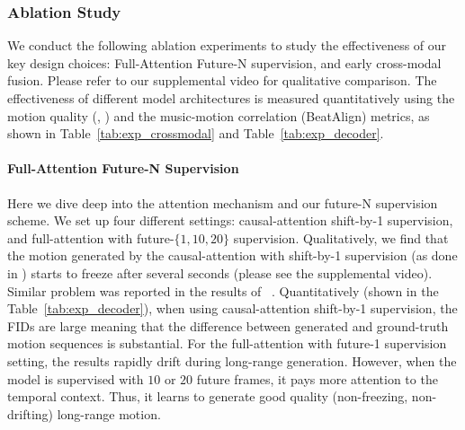 \subsubsection{Ablation Study}
\label{sec:ablation_study}
We conduct the following ablation experiments to study the effectiveness of our key design choices: Full-Attention Future-N supervision, and early cross-modal fusion. Please refer to our supplemental video for qualitative comparison.
The effectiveness of different model architectures is measured quantitatively using the motion quality (\FIDk, \FIDm) and the music-motion correlation (BeatAlign) metrics, as shown in Table~\ref{tab:exp_crossmodal} and Table~\ref{tab:exp_decoder}.

\vspace{-3mm}
\paragraph{Full-Attention Future-N Supervision}
\label{sec:attn_comp}
Here we dive deep into the attention mechanism and our future-N supervision scheme.
We set up four different settings: causal-attention shift-by-1 supervision, and full-attention with future-$\{1, 10, 20\}$ supervision.
Qualitatively, we find that the motion generated by the causal-attention with shift-by-1 supervision {(as done in \cite{li2020learning, radford2018improving,aksan2020attention})
starts to freeze after several seconds (please see the supplemental video).
Similar problem was reported in the results of ~\cite{aksan2020attention}.
Quantitatively (shown in the Table~\ref{tab:exp_decoder}), when using causal-attention shift-by-1 supervision, the FIDs are large meaning that the difference between generated and ground-truth motion sequences is substantial.} 
For the full-attention with future-1 supervision setting, the results rapidly drift during long-range generation. 
However, when the model is supervised with $10$ or $20$ future frames, it pays more attention to the temporal context. Thus, it learns to generate good quality (non-freezing, non-drifting) long-range motion.

